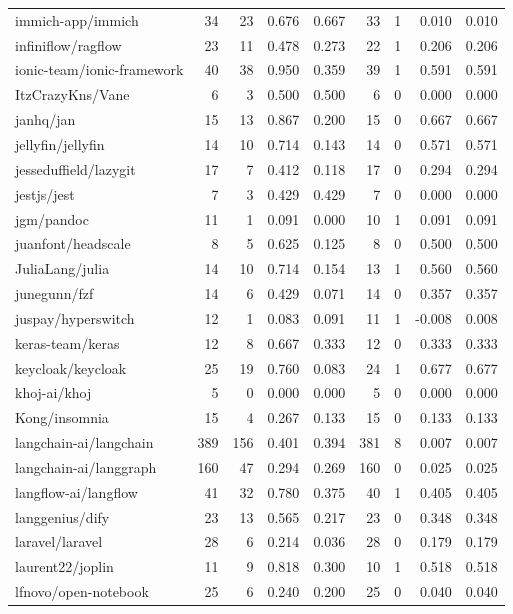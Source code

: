 \begin{tabular}{lrrrrrrrr}
immich-app/immich & 34 & 23 & 0.676 & 0.667 & 33 & 1 & 0.010 & 0.010 \\
infiniflow/ragflow & 23 & 11 & 0.478 & 0.273 & 22 & 1 & 0.206 & 0.206 \\
ionic-team/ionic-framework & 40 & 38 & 0.950 & 0.359 & 39 & 1 & 0.591 & 0.591 \\
ItzCrazyKns/Vane & 6 & 3 & 0.500 & 0.500 & 6 & 0 & 0.000 & 0.000 \\
janhq/jan & 15 & 13 & 0.867 & 0.200 & 15 & 0 & 0.667 & 0.667 \\
jellyfin/jellyfin & 14 & 10 & 0.714 & 0.143 & 14 & 0 & 0.571 & 0.571 \\
jesseduffield/lazygit & 17 & 7 & 0.412 & 0.118 & 17 & 0 & 0.294 & 0.294 \\
jestjs/jest & 7 & 3 & 0.429 & 0.429 & 7 & 0 & 0.000 & 0.000 \\
jgm/pandoc & 11 & 1 & 0.091 & 0.000 & 10 & 1 & 0.091 & 0.091 \\
juanfont/headscale & 8 & 5 & 0.625 & 0.125 & 8 & 0 & 0.500 & 0.500 \\
JuliaLang/julia & 14 & 10 & 0.714 & 0.154 & 13 & 1 & 0.560 & 0.560 \\
junegunn/fzf & 14 & 6 & 0.429 & 0.071 & 14 & 0 & 0.357 & 0.357 \\
juspay/hyperswitch & 12 & 1 & 0.083 & 0.091 & 11 & 1 & -0.008 & 0.008 \\
keras-team/keras & 12 & 8 & 0.667 & 0.333 & 12 & 0 & 0.333 & 0.333 \\
keycloak/keycloak & 25 & 19 & 0.760 & 0.083 & 24 & 1 & 0.677 & 0.677 \\
khoj-ai/khoj & 5 & 0 & 0.000 & 0.000 & 5 & 0 & 0.000 & 0.000 \\
Kong/insomnia & 15 & 4 & 0.267 & 0.133 & 15 & 0 & 0.133 & 0.133 \\
langchain-ai/langchain & 389 & 156 & 0.401 & 0.394 & 381 & 8 & 0.007 & 0.007 \\
langchain-ai/langgraph & 160 & 47 & 0.294 & 0.269 & 160 & 0 & 0.025 & 0.025 \\
langflow-ai/langflow & 41 & 32 & 0.780 & 0.375 & 40 & 1 & 0.405 & 0.405 \\
langgenius/dify & 23 & 13 & 0.565 & 0.217 & 23 & 0 & 0.348 & 0.348 \\
laravel/laravel & 28 & 6 & 0.214 & 0.036 & 28 & 0 & 0.179 & 0.179 \\
laurent22/joplin & 11 & 9 & 0.818 & 0.300 & 10 & 1 & 0.518 & 0.518 \\
lfnovo/open-notebook & 25 & 6 & 0.240 & 0.200 & 25 & 0 & 0.040 & 0.040 \\

\end{tabular}
